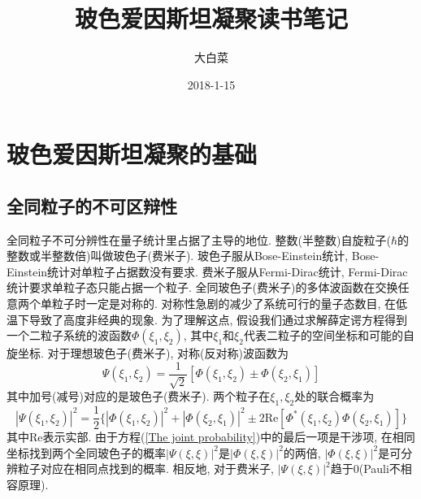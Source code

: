 \documentclass{book}
\begin{document}
\title{玻色爱因斯坦凝聚读书笔记}
\author{大白菜}
\date{2018-1-15}
\maketitle
\tableofcontents
\chapter{玻色爱因斯坦凝聚的基础}
\section{全同粒子的不可区辩性}
全同粒子不可分辨性在量子统计里占据了主导的地位. 整数(半整数)自旋粒子($\hbar$的整数或半整数倍)叫做玻色子(费米子). 玻色子服从Bose-Einstein统计, Bose-Einstein统计对单粒子占据数没有要求. 费米子服从Fermi-Dirac统计, Fermi-Dirac统计要求单粒子态只能占据一个粒子. 全同玻色子(费米子)的多体波函数在交换任意两个单粒子时一定是对称的. 对称性急剧的减少了系统可行的量子态数目, 在低温下导致了高度非经典的现象.
为了理解这点, 假设我们通过求解薛定谔方程得到一个二粒子系统的波函数$\Phi(\xi_1,\xi_2)$, 其中$\xi_1$和$\xi_2$代表二粒子的空间坐标和可能的自旋坐标. 对于理想玻色子(费米子), 对称(反对称)波函数为
\begin{equation}
  \Psi(\xi_1,\xi_2)=\frac{1}{\sqrt{2}}[\Phi(\xi_1,\xi_2)\pm\Phi(\xi_2,\xi_1)]
\end{equation}
其中加号(减号)对应的是玻色子(费米子). 两个粒子在$\xi_1,\xi_2$处的联合概率为
\begin{equation}\label{The joint probability}
  |\Psi(\xi_1,\xi_2)|^2=\frac{1}{2}\{|\Phi(\xi_1,\xi_2)|^2+|\Phi(\xi_2,\xi_1)|^2\pm2\mathrm{Re}[\Phi^*(\xi_1,\xi_2)\Phi(\xi_2,\xi_1)]\}
\end{equation}
其中$\mathrm{Re}$表示实部. 由于方程(\eqref{The joint probability})中的最后一项是干涉项, 在相同坐标找到两个全同玻色子的概率$|\Psi(\xi,\xi)|^2$是$|\Phi(\xi,\xi)|^2$的两倍, $|\Phi(\xi,\xi)|^2$是可分辨粒子对应在相同点找到的概率. 相反地, 对于费米子, $|\Psi(\xi,\xi)|^2$趋于$0$(Pauli不相容原理).
\end{document}
